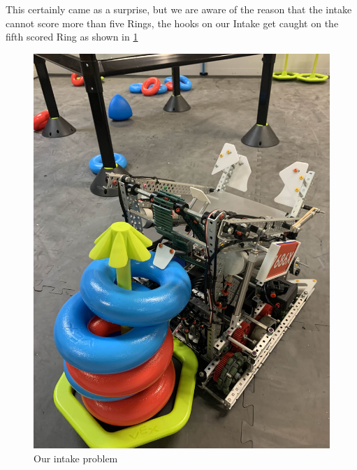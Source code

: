 This certainly came as a surprise, but we are aware of the reason that the intake cannot score more than five Rings, the hooks on our Intake get caught on the fifth scored Ring as shown in \ref{fig:intakeproblem}
\begin{figure}[h!]
    \centering
    \includegraphics[width=0.5\linewidth]{images/Intake-problem.jpg}
    \caption{Our intake problem}
    \label{fig:intakeproblem}
\end{figure}